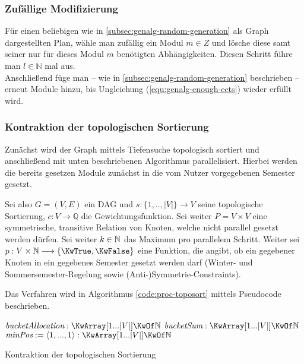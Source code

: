 \subsubsection{Zufällige Modifizierung}
\label{subsec:genalg-random-modification}
Für einen beliebigen wie in \ref{subsec:genalg-random-generation} als Graph dargestellten Plan, wähle man zufällig ein Modul $m \in Z$ und lösche diese samt seiner nur für dieses Modul $m$ benötigten Abhängigkeiten. Diesen Schritt führe man $l \in \mathbb{N}$ mal aus.\\
Anschließend füge man -- wie in \ref{subsec:genalg-random-generation} beschrieben -- erneut Module hinzu, bis Ungleichung (\ref{equ:genalg-enough-ects}) wieder erfüllt wird.

\subsubsection{Kontraktion der topologischen Sortierung}
\label{subsec:genalg-contract-topolog-sort}
Zunächst wird der Graph mittels Tiefensuche topologisch sortiert und
anschließend  mit unten beschriebenen Algorithmus parallelisiert.
Hierbei werden die bereits gesetzen Module zunächst in die vom Nutzer vorgegebenen Semester gesetzt.

Sei also $G = (V,E)$ ein DAG und $s: \{1,..,|V|\} \to V$ seine topologische Sortierung, $c: V \to \mathbb{Q}$ die Gewichtungsfunktion. Sei weiter $P = V \times V$ eine symmetrische, transitive Relation von Knoten, welche nicht parallel gesetzt werden dürfen.
Sei weiter $ k \in \mathbb{N} $ das Maximum pro parallelem Schritt.
Weiter sei $ p: V \times \NN \to \{\KwTrue, \KwFalse\} $ eine Funktion, die angibt, ob ein gegebener Knoten in ein gegebenes Semester gesetzt werden darf (Winter- und Sommersemester-Regelung sowie (Anti-)Symmetrie-Constraints).

Das Verfahren wird in Algorithmus \ref{code:proc-toposort} mittels Pseudocode beschrieben.

\begin{algorithm}[H]
	\label{code:proc-toposort}
	$\Var{bucketAllocation} : \KwArray [1...|V|] \KwOf \NN $ \;
	$\Var{bucketSum} : \KwArray [1...|V|] \KwOf \NN $ \;
	$\Var{minPos} := \langle 1,...,1 \rangle: \KwArray [1...|V|] \KwOf \NN $ \;
	\BlankLine
	\caption{Kontraktion der topologischen Sortierung}
\end{algorithm}
	


